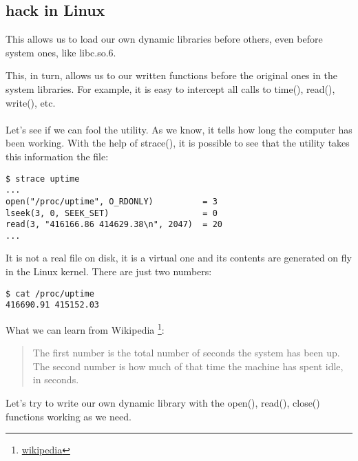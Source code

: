 \subsection{ hack in Linux}

\label{ld_preload}

This allows us to load our own dynamic libraries before others, even before system ones, like libc.so.6.

This, in turn, allows us to  our written functions before the original ones in the system libraries.
For example, it is easy to intercept all calls to 
time(), read(), write(), etc. \\
\\
Let's see if we can fool the  utility.
As we know, it tells how long the computer has been working.
With the help of strace(), it is possible to see that the utility takes this information the  file:

\begin{lstlisting}
$ strace uptime 
...
open("/proc/uptime", O_RDONLY)          = 3
lseek(3, 0, SEEK_SET)                   = 0
read(3, "416166.86 414629.38\n", 2047)  = 20
...
\end{lstlisting}

It is not a real file on disk, it is a virtual one and its contents are generated on fly in the Linux kernel.
There are just two numbers:

\begin{lstlisting}
$ cat /proc/uptime
416690.91 415152.03
\end{lstlisting}

What we can learn from Wikipedia
\footnote{\href{http://go.yurichev.com/17043}{wikipedia}}:

\begin{framed}
\begin{quotation}
The first number is the total number of seconds the system has been up.
The second number is how much of that time the machine has spent idle, in seconds.
\end{quotation}
\end{framed}


Let's try to write our own dynamic library with the open(), read(), close() 
functions working as we need.


